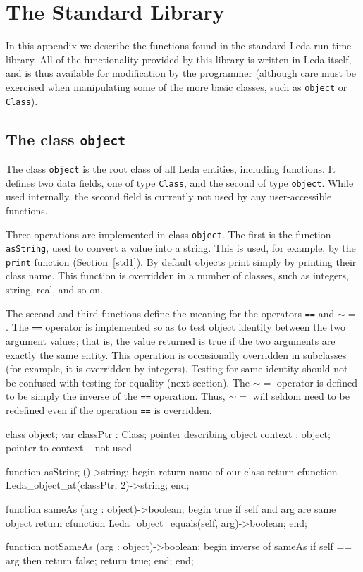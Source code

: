 \chapter{The Standard Library}

In this appendix we describe the functions found in the standard Leda
run-time library.  All of the functionality provided by this library is
written in Leda itself, and is thus available for modification by
the programmer (although care must be exercised when manipulating
some of the more basic classes, such as {\tt object} or {\tt Class}).

\section{The class {\tt object}}\label{std3}

The class {\tt object} is the root class of all Leda entities,
including functions.  It defines two data fields, one of type {\tt Class},
and the second of type {\tt object}.  While used internally, the second field
is currently not used by any user-accessible functions.

Three operations are implemented in class {\tt object}.
The first is the function {\tt asString}, used to convert a value into
a string.  This is used, for example, by the {\tt print} function
(Section~\ref{std1}).  By default objects print simply by printing their
class name.  This function is overridden in a number of classes, such
as integers, string, real, and so on.

The second and third functions define the meaning for the operators
\verb+==+ and $\sim\! =$.  The \verb+==+ operator is implemented so
as to test object identity between the two argument values; that is,
the value returned is true if the two arguments are exactly the same
entity.  This operation is occasionally overridden in subclasses (for
example, it is overridden by integers).  Testing for same identity should
not be confused with testing for equality (next section).  The
$\sim\! =$ operator is defined to be simply the inverse of the \verb+==+
operation.  Thus, $\sim\! =$ will seldom need to be redefined even
if the operation \verb+==+ is overridden.

\begin{cprog}

class object;
var
	classPtr : Class;	{ pointer describing object }
	context : object;	{ pointer to context -- not used }

	function asString ()->string;
	begin		{ return name of our class }
		return cfunction
			Leda_object_at(classPtr, 2)->string;
	end;

	function sameAs (arg : object)->boolean;
	begin		{ true if self and arg are same object }
		return cfunction Leda_object_equals(self, arg)->boolean;
	end;

	function notSameAs (arg : object)->boolean;
	begin		{ inverse of sameAs }
		if self == arg then
			return false;
		return true;
	end;
end;

\end{cprog}

